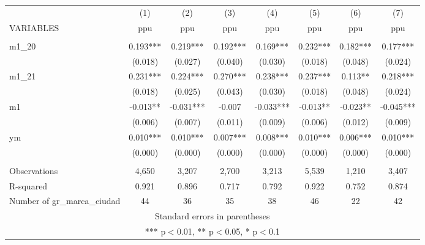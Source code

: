 \begin{tabular}{lccccccc} \hline
 & (1) & (2) & (3) & (4) & (5) & (6) & (7) \\
VARIABLES & ppu & ppu & ppu & ppu & ppu & ppu & ppu \\ \hline
 &  &  &  &  &  &  &  \\
m1\_20 & 0.193*** & 0.219*** & 0.192*** & 0.169*** & 0.232*** & 0.182*** & 0.177*** \\
 & (0.018) & (0.027) & (0.040) & (0.030) & (0.018) & (0.048) & (0.024) \\
m1\_21 & 0.231*** & 0.224*** & 0.270*** & 0.238*** & 0.237*** & 0.113** & 0.218*** \\
 & (0.018) & (0.025) & (0.043) & (0.030) & (0.018) & (0.048) & (0.024) \\
m1 & -0.013** & -0.031*** & -0.007 & -0.033*** & -0.013** & -0.023** & -0.045*** \\
 & (0.006) & (0.007) & (0.011) & (0.009) & (0.006) & (0.012) & (0.009) \\
ym & 0.010*** & 0.010*** & 0.007*** & 0.008*** & 0.010*** & 0.006*** & 0.010*** \\
 & (0.000) & (0.000) & (0.000) & (0.000) & (0.000) & (0.000) & (0.000) \\
 &  &  &  &  &  &  &  \\
Observations & 4,650 & 3,207 & 2,700 & 3,213 & 5,539 & 1,210 & 3,407 \\
R-squared & 0.921 & 0.896 & 0.717 & 0.792 & 0.922 & 0.752 & 0.874 \\
 Number of gr\_marca\_ciudad & 44 & 36 & 35 & 38 & 46 & 22 & 42 \\ \hline
\multicolumn{8}{c}{ Standard errors in parentheses} \\
\multicolumn{8}{c}{ *** p$<$0.01, ** p$<$0.05, * p$<$0.1} \\
\end{tabular}
